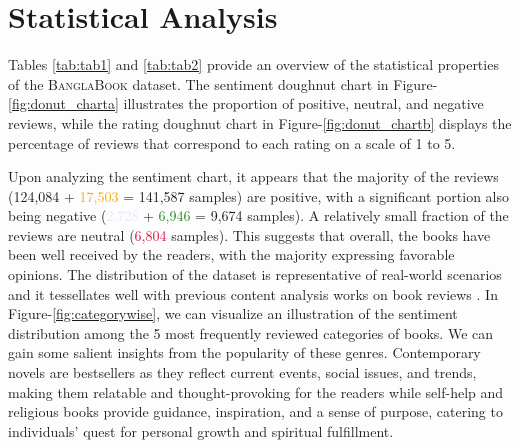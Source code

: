 \section{Statistical Analysis}
Tables \ref{tab:tab1} and \ref{tab:tab2} provide an overview of the statistical properties of the \textsc{BanglaBook} dataset. The sentiment doughnut chart in Figure-\ref{fig:donut_charta} illustrates the proportion of positive, neutral, and negative reviews, while the rating doughnut chart in Figure-\ref{fig:donut_chartb} displays the percentage of reviews that correspond to each rating on a scale of 1 to 5.

Upon analyzing the sentiment chart, it appears that the majority of the reviews (\textcolor{NavyBlue}{124,084} + \textcolor{orange}{17,503} = 141,587 samples) are positive, with a significant portion also being negative (\textcolor{Lavender}{2,728} + \textcolor{ForestGreen}{6,946} = 9,674 samples). A relatively small fraction of the reviews are neutral (\textcolor{Crimson}{6,804} samples). This suggests that overall, the books have been well received by the readers, with the majority expressing favorable opinions. The distribution of the dataset is representative of real-world scenarios and it tessellates well with previous content analysis works on book reviews \cite{lin2005effect,sorensen2004any}. 
In Figure-\ref{fig:categorywise}, we can visualize an illustration of the sentiment distribution among the 5 most frequently reviewed categories of books. We can gain some salient insights from the popularity of these genres. Contemporary novels are bestsellers as they reflect current events, social issues, and trends, making them relatable and thought-provoking for the readers while self-help and religious books provide guidance, inspiration, and a sense of purpose, catering to individuals' quest for personal growth and spiritual fulfillment.

